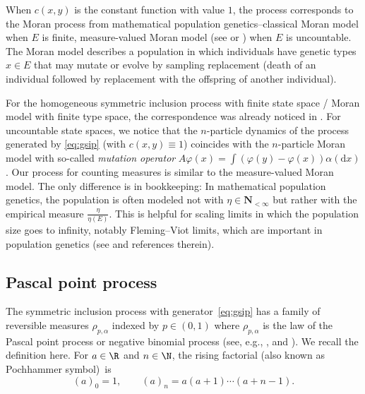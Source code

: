 When $c(x,y)$ is the constant function with value $1$, the process corresponds to the Moran process from mathematical population genetics--classical Moran model \cite{TransitionMoran,Moran} when $E$ is finite, measure-valued Moran model (see \cite[Section 2.6]{DawsonMeasureValuedMarkovProcesses} or \cite[Section~5.4]{Etheridge00}) when $E$ is uncountable. The Moran model describes a population in which individuals have genetic types $x\in E$ that may mutate or evolve by sampling replacement (death of an individual followed by replacement with the offspring of another individual).

For the homogeneous symmetric inclusion process with finite state space / Moran model with finite type space, the correspondence was already noticed in \cite[Section~5]{carinci2015dualities}. For uncountable state spaces, we notice that the $n$-particle dynamics of the process generated by \eqref{eq:gsip} (with $c(x,y) \equiv 1$) coincides with the $n$-particle Moran model \cite[equation~(2.5.2)]{DawsonMeasureValuedMarkovProcesses} with so-called \emph{mutation operator} $A\varphi(x) = \int( \varphi(y) - \varphi(x)) \alpha(\mathrm d x)$. Our process for counting measures is similar to the measure-valued Moran model. The only difference is in bookkeeping: In mathematical population genetics, the population is often modeled not with $\eta \in \mathbf N_{<\infty}$ but rather with the empirical measure $\frac{\eta}{\eta(E)}$. This is helpful for scaling limits in which the population size goes to infinity, notably Fleming--Viot limits, which are important in population genetics (see \cite{shigaDiffusions} and references therein).

\subsection{Pascal point process} \label{sec:pascaldef}
The symmetric inclusion process with generator~\eqref{eq:gsip} has a family of reversible measures $\rho_{p,\alpha}$ indexed by $p\in (0,1)$ \cite[Theorem 5.2]{IntertwiningConsistent} where $\rho_{p,\alpha}$ is the law of the Pascal point process or negative binomial process (see, e.g., \cite[Section~2.7]{serfozo1990point}, \cite{kozubowski2008distributional} and \cite[Section~5.2]{IntertwiningConsistent}). We recall the definition here.
For $a\in \R$ and $n\in \N$, the rising factorial (also known as Pochhammer symbol)~is
\[
	(a)_0 = 1,\qquad (a)_n = a(a+1)\cdots (a+n-1).
\]

